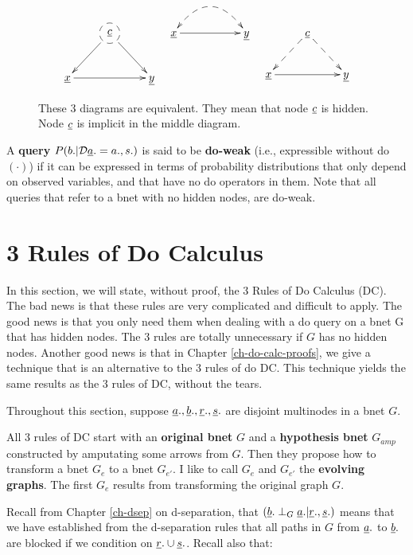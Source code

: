 \begin{figure}[h!]
$$\xymatrix{
&*++[F-o]{\rvc}\ar[dl]\ar[dr]
\\
\rvx\ar[rr]&&\rvy
}
\;\;\;
\xymatrix{
\rvx\ar@{-->}@{<-->}@/^2pc/[rr]
\ar[rr]&&\rvy
}
\;\;\;
\xymatrix{
&\rvc\ar@{-->}[dl]\ar@{-->}[dr]
\\
\rvx\ar[rr]&&\rvy
}$$
\caption{
These 3 diagrams
are equivalent.
They
mean that node $\rvc$
is hidden.
Node $\rvc$
is implicit
in the
middle diagram.}
\label{fig-hidden-dashes}
\end{figure}

A {\bf query} $P(b.|\cald \rva.=a., s.)$
is said to be {\bf do-weak}
(i.e., expressible without do$(\cdot)$)
if it can be
expressed in terms of
probability distributions
that only
depend on observed
variables, and that
have no do operators
in them.
Note that all queries that refer to a bnet 
with no hidden nodes, are do-weak.



\section{3 Rules of Do Calculus}

In this section, we will state, without proof,
the 3 Rules of Do Calculus (DC). The bad news is that these rules 
are very complicated and difficult
to apply. The good news is that you only need them 
when dealing with a do query on
a bnet G that has hidden nodes. The 3 rules are totally 
unnecessary if $G$ has no hidden nodes.
Another good news is that in Chapter \ref{ch-do-calc-proofs}, we give 
a technique that is
an alternative to the 3 rules 
of do DC. This technique yields the same
results as  the 3 rules of DC, without
the tears.

Throughout
this section, suppose
$\rva., \rvb., \rvr.,
\rvs.$ are disjoint
multinodes in a bnet $G$.


All 3 rules of DC start with an
{\bf original bnet} $G$ and a {\bf hypothesis bnet}
$G_{amp}$ constructed by amputating
some arrows from $G$. Then they propose how
to transform a bnet $G_e$ to a bnet $G_{e'}$. I like to call 
$G_e$ and $G_{e'}$ the {\bf evolving graphs}. The first $G_e$ 
results from transforming the  original graph $G$.


Recall
from Chapter \ref{ch-dsep}
on d-separation,
that  $(\rvb.\perp_G \rva.|\rvr., \rvs.)$
means that
we have established
from the d-separation
rules that
all
paths in $G$
 from
$\rva.$ to
$\rvb.$
are blocked
if we condition
on $\rvr.\cup \rvs.$.
Recall also that:


